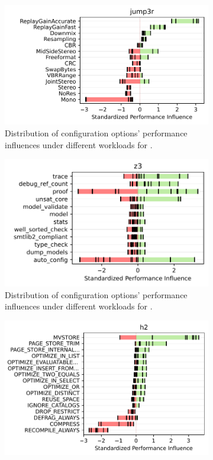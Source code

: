 {{{{\begin{figure}[ht!]
	\centering
	\begin{subfigure}{\linewidth}
		\hfill\includegraphics[width=0.98\linewidth]{images/jump3r.pdf}
		\caption{Distribution of configuration options' performance influences under different workloads for \jumper.}
		\label{fig:overview_jump3r}
	\end{subfigure}
	\begin{subfigure}{\linewidth}
		\hfill%
		\includegraphics[width=0.92\linewidth]{images/z3.pdf}
		\vfill
		\caption{Distribution of configuration options' performance influences under different workloads for \zdrei.}
		\label{fig:overview_z3}
	\end{subfigure}
	\begin{subfigure}{\linewidth}
		\hfill\includegraphics[width=1.0\linewidth]{images/h2.pdf}

\end{subfigure}
\end{figure}}}}}
